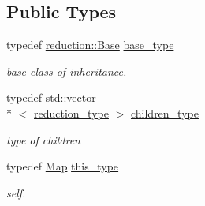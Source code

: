 \subsection*{Public Types}
\begin{DoxyCompactItemize}
\item 
\hypertarget{classhryky_1_1reduction_1_1_map_aee713406a4a77c0edde484d46d7079c5}{typedef \hyperlink{classhryky_1_1reduction_1_1_base}{reduction\-::\-Base} \hyperlink{classhryky_1_1reduction_1_1_map_aee713406a4a77c0edde484d46d7079c5}{base\-\_\-type}}\label{classhryky_1_1reduction_1_1_map_aee713406a4a77c0edde484d46d7079c5}

\begin{DoxyCompactList}\small\item\em base class of inheritance. \end{DoxyCompactList}\item 
\hypertarget{classhryky_1_1reduction_1_1_map_af8ee925fbe74bda242e9dfb7e9f388d1}{typedef std\-::vector\\*
$<$ \hyperlink{namespacehryky_a343a9a4c36a586be5c2693156200eadc}{reduction\-\_\-type} $>$ \hyperlink{classhryky_1_1reduction_1_1_map_af8ee925fbe74bda242e9dfb7e9f388d1}{children\-\_\-type}}\label{classhryky_1_1reduction_1_1_map_af8ee925fbe74bda242e9dfb7e9f388d1}

\begin{DoxyCompactList}\small\item\em type of children \end{DoxyCompactList}\item 
\hypertarget{classhryky_1_1reduction_1_1_map_a256907f5d2ed071a6e9b966f93989155}{typedef \hyperlink{classhryky_1_1reduction_1_1_map}{Map} \hyperlink{classhryky_1_1reduction_1_1_map_a256907f5d2ed071a6e9b966f93989155}{this\-\_\-type}}\label{classhryky_1_1reduction_1_1_map_a256907f5d2ed071a6e9b966f93989155}

\begin{DoxyCompactList}\small\item\em self. \end{DoxyCompactList}\end{DoxyCompactItemize}
